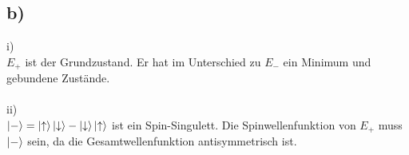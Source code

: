 \subsection{b)}
i)\\
$E_+$ ist der Grundzustand. Er hat im Unterschied zu $E_-$ ein Minimum und gebundene Zust\"ande.\\
\\
ii)\\
$\Ket{-} = \Ket{\uparrow} \Ket{\downarrow} - \Ket{\downarrow} \Ket{\uparrow}$ ist ein Spin-Singulett. Die Spinwellenfunktion von $E_+$ muss $\Ket{-}$ sein, da die Gesamtwellenfunktion antisymmetrisch ist.